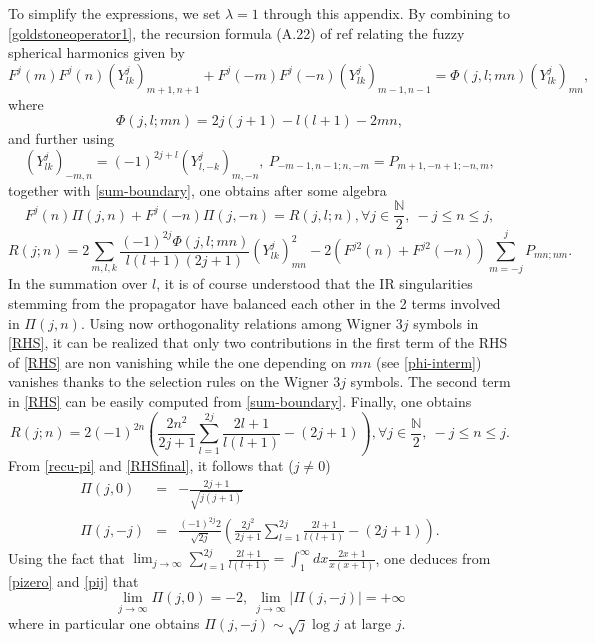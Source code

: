 \documentclass[a4paper,11pt]{article}
\numberwithin{equation}{section}
\theoremstyle{nonumberplain}
\begin{document}
To simplify the expressions, we set $\lambda=1$ through this appendix. By combining to \eqref{goldstoneoperator1}, the recursion formula (A.22) of ref \cite{vit-wal-12} relating the fuzzy spherical harmonics given by 
\begin{equation}
F^j(m)F^j(n)(Y^j_{lk})_{m+1,n+1}+F^j(-m)F^j(-n)(Y^j_{lk})_{m-1,n-1}=\Phi(j,l;mn)(Y^j_{lk})_{mn},
\end{equation}
where
\begin{equation}
\Phi(j,l;mn)=2j(j+1)-l(l+1)-2mn,\label{phi-interm}
\end{equation}
and further using
\begin{equation}
(Y^j_{lk})_{-m,n}=(-1)^{2j+l}(Y^j_{l,-k})_{m,-n},\ P_{-m-1,n-1;n,-m}=P_{m+1,-n+1;-n,m},
\end{equation}
together with \eqref{sum-boundary}, one obtains after some algebra
\begin{equation}
F^j(n)\Pi(j,n)+F^j(-n)\Pi(j,-n)=R(j,l;n),\forall j\in\frac{\mathbb{N}}{2},\ -j\le n\le j,\label{recu-pi}
\end{equation}
\begin{equation}
R(j;n)=2\sum_{m,l,k}\frac{(-1)^{2j}\Phi(j,l;mn)}{l(l+1)(2j+1)}(Y^j_{lk})^2_{mn}-2(F^{j2}(n)+F^{j2}(-n))\sum_{m=-j}^jP_{mn;nm}\label{RHS}.
\end{equation}
In the summation over $l$, it is of course understood that the IR singularities stemming from the propagator have balanced each other in the 2 terms involved in $\Pi(j,n)$. Using now orthogonality relations among Wigner $3j$ symbols in \eqref{RHS}, it can be realized that only two contributions in the first term of the RHS of \eqref{RHS} are non vanishing while the one depending on $mn$ (see \eqref{phi-interm}) vanishes thanks to the selection rules on the Wigner $3j$ symbols. The second term in \eqref{RHS} can be easily computed from \eqref{sum-boundary}. Finally, one obtains
\begin{equation}
R(j;n)=2(-1)^{2n}(\frac{2n^2}{2j+1}\sum_{l=1}^{2j}\frac{2l+1}{l(l+1)}-(2j+1)), \forall j\in\frac{\mathbb{N}}{2},\ -j\le n\le j\label{RHSfinal}.
\end{equation}
From \eqref{recu-pi} and \eqref{RHSfinal}, it follows that ($j\ne0$)
\begin{eqnarray}
\Pi(j,0)&=& -\frac{2j+1}{\sqrt{j(j+1)}}\label{pizero}\\
\Pi(j,-j)&=& \frac{(-1)^{2j}2}{{\sqrt{2j}}}(\frac{2j^2}{2j+1}\sum_{l=1}^{2j}\frac{2l+1}{l(l+1)}-(2j+1))\label{pij}.
\end{eqnarray}
Using the fact that $\lim_{j\to\infty}\sum_{l=1}^{2j}\frac{2l+1}{l(l+1)}=\int_1^\infty dx\frac{2x+1}{x(x+1)}$, one deduces from \eqref{pizero} and \eqref{pij} that
\begin{equation}
\lim_{j\to\infty}\Pi(j,0)=-2,\ \lim_{j\to\infty}\vert \Pi(j,-j)\vert=+\infty\label{limit-pi}
\end{equation}
where in particular one obtains $\Pi(j,-j)\sim{\sqrt{j}}\log j$ at large $j$.
\end{document}
